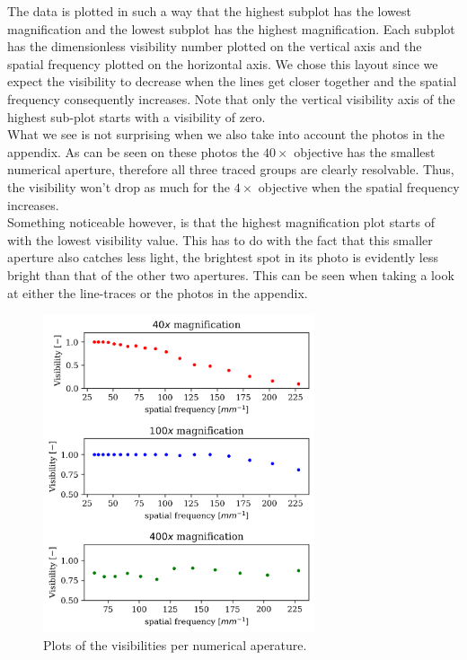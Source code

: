 The data is plotted in such a way that the highest subplot has the lowest magnification and the lowest subplot has the highest magnification. Each subplot has the dimensionless visibility number plotted on the vertical axis and the spatial frequency plotted on the horizontal axis. We chose this layout since we expect the visibility to decrease when the lines get closer together and the spatial frequency consequently increases. Note that only the vertical visibility axis of the highest sub-plot starts with a visibility of zero.\\
What we see is not surprising when we also take into account the photos in the appendix. As can be seen on these photos the $40\times$ objective has the smallest numerical aperture, therefore all three traced groups are clearly resolvable. Thus, the visibility won't drop as much for the $4\times$ objective when the spatial frequency increases.\\
Something noticeable however, is that the highest magnification plot starts of with the lowest visibility value. This has to do with the fact that this smaller aperture also catches less light, the brightest spot in its photo is evidently less bright than that of the other two apertures. This can be seen when taking a look at either the line-traces or the photos in the appendix.

\begin{figure}[h!]
    \centering
    \includegraphics[width=8cm,keepaspectratio]{afbeeldingen/visibilities.png}
    \caption{Plots of the visibilities per numerical aperature.}
    \label{fig:visibilities}
\end{figure}

